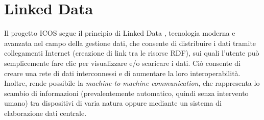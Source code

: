 \section{Linked Data}
\label{section:linkeddata}
Il progetto ICOS segue il principio di Linked Data \cite{ICOSHandbook2020}, tecnologia moderna
e avanzata nel campo della gestione dati, che consente di distribuire
i dati tramite collegamenti Internet (creazione di link tra
le risorse RDF), sui quali l'utente
può semplicemente fare clic per visualizzare
e/o scaricare i dati. Ciò consente di creare
una rete di dati interconnessi
e di aumentare la loro interoperabilità. 
Inoltre, rende possibile la \textit{machine-to-machine
communication}, 
che rappresenta lo scambio di informazioni (prevalentemente
automatico,
quindi senza intervento umano) tra dispositivi di varia natura 
oppure mediante un sistema di elaborazione dati centrale.



